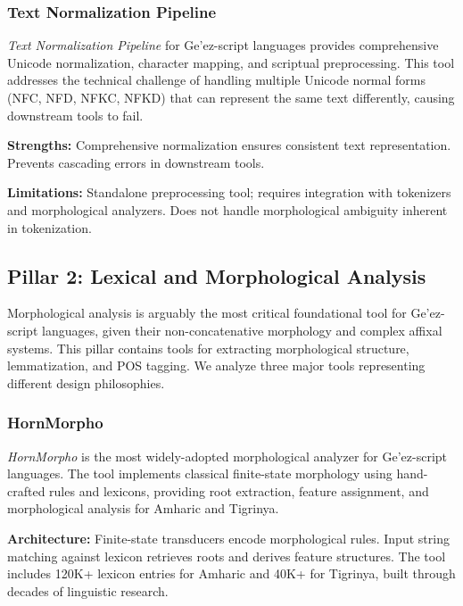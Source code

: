 \documentclass[12pt,a4paper]{article}
\theoremstyle{plain}
\theoremstyle{definition}
\newcommand{\tooldesc}[1]{{\textit{#1}}}
\begin{document}
\subsubsection{Text Normalization Pipeline}

\textit{Text Normalization Pipeline} for Ge'ez-script languages provides comprehensive Unicode normalization, character mapping, and scriptual preprocessing. This tool addresses the technical challenge of handling multiple Unicode normal forms (NFC, NFD, NFKC, NFKD) that can represent the same text differently, causing downstream tools to fail.

\textbf{Strengths:} Comprehensive normalization ensures consistent text representation. Prevents cascading errors in downstream tools.

\textbf{Limitations:} Standalone preprocessing tool; requires integration with tokenizers and morphological analyzers. Does not handle morphological ambiguity inherent in tokenization.


\subsection{Pillar 2: Lexical and Morphological Analysis}
\label{subsec:pillar2}

Morphological analysis is arguably the most critical foundational tool for Ge'ez-script languages, given their non-concatenative morphology and complex affixal systems. This pillar contains tools for extracting morphological structure, lemmatization, and POS tagging. We analyze three major tools representing different design philosophies.

\subsubsection{HornMorpho}

\tooldesc{HornMorpho} is the most widely-adopted morphological analyzer for Ge'ez-script languages. The tool implements classical finite-state morphology using hand-crafted rules and lexicons, providing root extraction, feature assignment, and morphological analysis for Amharic and Tigrinya.

\textbf{Architecture:} Finite-state transducers encode morphological rules. Input string matching against lexicon retrieves roots and derives feature structures. The tool includes 120K+ lexicon entries for Amharic and 40K+ for Tigrinya, built through decades of linguistic research.
\end{document}

